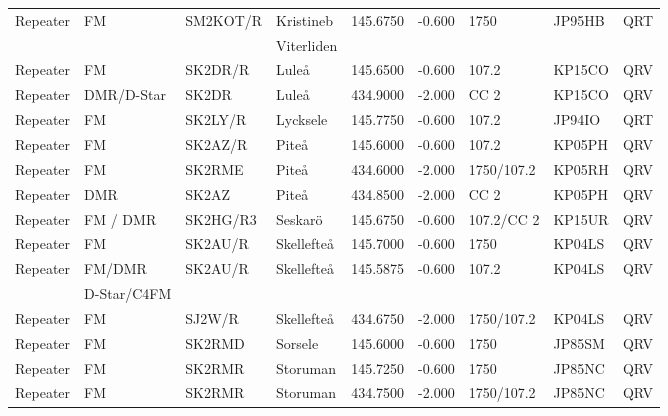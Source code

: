 \begin{longtable}{llllrrlll}
Repeater   & FM          & SM2KOT/R  & Kristineb          & 145.6750     & -0.600     & 1750       & JP95HB      & QRT      \\
           &             &           & Viterliden         &              &            &            &             &          \\
Repeater   & FM          & SK2DR/R   & Luleå              & 145.6500     & -0.600     & 107.2      & KP15CO      & QRV      \\
Repeater   & DMR/D-Star  & SK2DR     & Luleå              & 434.9000     & -2.000     & CC 2       & KP15CO      & QRV      \\
Repeater   & FM          & SK2LY/R   & Lycksele           & 145.7750     & -0.600     & 107.2      & JP94IO      & QRT      \\
Repeater   & FM          & SK2AZ/R   & Piteå              & 145.6000     & -0.600     & 107.2      & KP05PH      & QRV      \\
Repeater   & FM          & SK2RME    & Piteå              & 434.6000     & -2.000     & 1750/107.2 & KP05RH      & QRV      \\
Repeater   & DMR         & SK2AZ     & Piteå              & 434.8500     & -2.000     & CC 2       & KP05PH      & QRV      \\
Repeater   & FM / DMR    & SK2HG/R3  & Seskarö            & 145.6750     & -0.600     & 107.2/CC 2 & KP15UR      & QRV      \\
Repeater   & FM          & SK2AU/R   & Skellefteå         & 145.7000     & -0.600     & 1750       & KP04LS      & QRV      \\
Repeater   & FM/DMR      & SK2AU/R   & Skellefteå         & 145.5875     & -0.600     & 107.2      & KP04LS      & QRV      \\
           & D-Star/C4FM &           &                    &              &            &            &             &          \\
Repeater   & FM          & SJ2W/R    & Skellefteå         & 434.6750     & -2.000     & 1750/107.2 & KP04LS      & QRV      \\
Repeater   & FM          & SK2RMD    & Sorsele            & 145.6000     & -0.600     & 1750       & JP85SM      & QRV      \\
Repeater   & FM          & SK2RMR    & Storuman           & 145.7250     & -0.600     & 1750       & JP85NC      & QRV      \\
Repeater   & FM          & SK2RMR    & Storuman           & 434.7500     & -2.000     & 1750/107.2 & JP85NC      & QRV      \\

\end{longtable}
